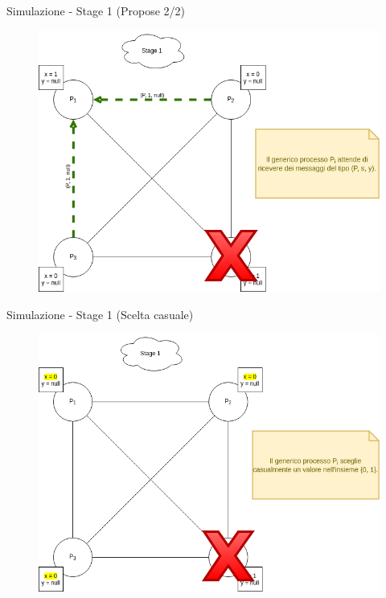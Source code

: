\documentclass{beamer}
\begin{document}
\begin{frame}{Simulazione - Stage 1 (Propose 2/2)}
\begin{figure}
    \centering
    \includegraphics[scale=0.35]{simulazione/simulazione6.png}
\end{figure}
\end{frame}

\begin{frame}{Simulazione - Stage 1 (Scelta casuale)}
\begin{figure}
    \centering
    \includegraphics[scale=0.35]{simulazione/simulazione7.png}
\end{figure}
\end{frame}
\end{document}
